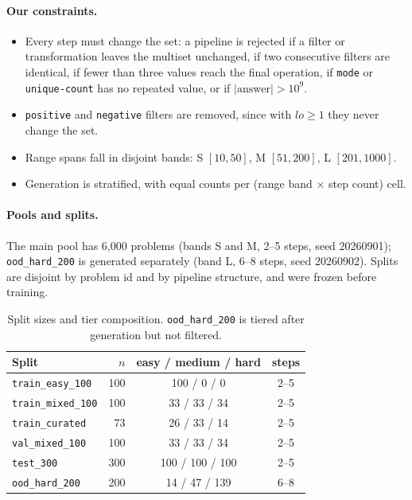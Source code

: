 \documentclass{article}
\begin{document}
%
\paragraph{Our constraints.}
\begin{itemize}
  \item Every step must change the set: a pipeline is rejected if a filter or transformation leaves the multiset unchanged, if two consecutive filters are identical, if fewer than three values reach the final operation, if \texttt{mode} or \texttt{unique-count} has no repeated value, or if $|\text{answer}| > 10^9$.
  \item \texttt{positive} and \texttt{negative} filters are removed, since with $lo \geq 1$ they never change the set.
  \item Range spans fall in disjoint bands: S $[10, 50]$, M $[51, 200]$, L $[201, 1000]$.
  \item Generation is stratified, with equal counts per (range band $\times$ step count) cell.
\end{itemize}

\paragraph{Pools and splits.} The main pool has 6{,}000 problems (bands S and M, 2--5 steps, seed 20260901); \texttt{ood\_hard\_200} is generated separately (band L, 6--8 steps, seed 20260902). Splits are disjoint by problem id and by pipeline structure, and were frozen before training.

\begin{table}[!ht]
\centering\small
\caption{Split sizes and tier composition. \texttt{ood\_hard\_200} is tiered after generation but not filtered.}
\label{tab:splits}
\begin{tabular}{lrcc}
\toprule
Split & $n$ & easy / medium / hard & steps \\
\midrule
\texttt{train\_easy\_100}  & 100 & 100 / 0 / 0   & 2--5 \\
\texttt{train\_mixed\_100} & 100 & 33 / 33 / 34  & 2--5 \\
\texttt{train\_curated}    & 73  & 26 / 33 / 14  & 2--5 \\
\texttt{val\_mixed\_100}   & 100 & 33 / 33 / 34  & 2--5 \\
\texttt{test\_300}         & 300 & 100 / 100 / 100 & 2--5 \\
\texttt{ood\_hard\_200}    & 200 & 14 / 47 / 139 & 6--8 \\
\bottomrule
\end{tabular}
\end{table}
\end{document}
